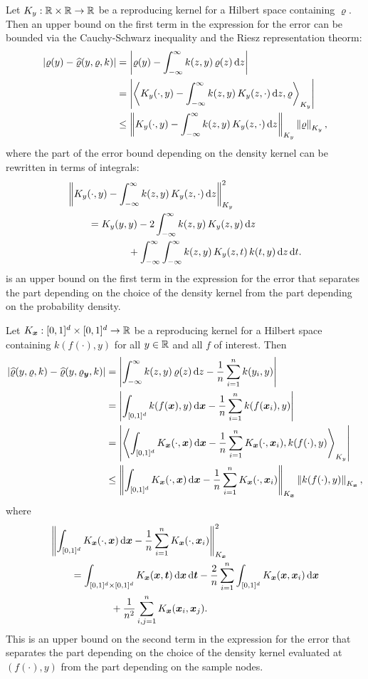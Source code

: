 \documentclass[letterpaper]{amsart}
\newcommand{\hvarrho}{\widehat{\varrho}}
\newcommand{\KY}{K_y}
\newcommand{\KX}{K_{\vx}}
\begin{document}
Let $\KY:\reals \times \reals \to \reals$ be a reproducing kernel for a Hilbert space containing $\varrho$.  Then an upper bound on the first term in the expression for the error can be bounded via the Cauchy-Schwarz inequality and the Riesz representation theorm:
\begin{align}
\label{eq:firstbd}
\abs{\varrho(y) - \hvarrho(y,\varrho,k)}
& = \abs{\varrho(y) - \int_{-\infty}^{\infty} k(z,y) \, \varrho(z) \, \dif z} \\
\nonumber
& = \abs{\ip[\KY]{\KY(\cdot,y) - \int_{-\infty}^{\infty} k(z,y) \, \KY(z,\cdot) \,  \dif z}{\varrho} } \\
\nonumber
& \le  \norm[\KY]{\KY(\cdot,y) - \int_{-\infty}^{\infty} k(z,y) \, \KY(z,\cdot) \, \dif z} \norm[\KY]{\varrho},
\end{align}
where the part of the error bound depending on the density kernel can be rewritten in terms of integrals:
\begin{align}
\label{eq:kquality}
\MoveEqLeft{\norm[\KY]{\KY(\cdot,y) - \int_{-\infty}^{\infty} k(z,y) \, \KY(z,\cdot) \, \dif z}^2} \\ \nonumber
&=  \KY(y,y) - 2 \int_{-\infty}^{\infty} k(z,y) \, \KY(z,y) \, \dif z \\ \nonumber
& \qquad \qquad + \int_{-\infty}^{\infty} \int_{-\infty}^{\infty}  k(z,y) \, \KY(z,t) \, k(t,y)\, \dif z \, \dif t.
\end{align}
 is an upper bound on the first term in the expression for the error that separates the part depending on the choice of the density kernel from the part depending on the probability density.

Let $\KX: [0,1]^d \times [0,1]^d\to \reals$ be a reproducing kernel for a Hilbert space containing $k(f(\cdot),y)$ for all $y \in \mathbb{R}$ and all $f$ of interest. Then
\begin{align*}
\abs{\hvarrho(y,\varrho,k) - \hvarrho(y,\varrho_{\vy},k)}
& = \abs{\int_{-\infty}^{\infty} k(z,y) \, \varrho(z) \, \dif z -
\frac 1n \sum_{i=1}^n k(y_i,y)} \\
& = \abs{\int_{[0,1]^d} k(f(\vx),y) \, \dif \vx -
\frac 1n \sum_{i=1}^n k(f(\vx_i),y)} \\
& = \abs{\ip[\KY]{\int_{[0,1]^d} \KX(\cdot,\vx) \, \dif \vx -
\frac 1n \sum_{i=1}^n \KX(\cdot,\vx_i)}{k(f(\cdot),y) }} \\
& \le  \norm[\KX]{\int_{[0,1]^d} \KX(\cdot,\vx) \, \dif \vx -
\frac 1n \sum_{i=1}^n \KX(\cdot,\vx_i)} \norm[\KX]{k(f(\cdot),y) } ,
\end{align*}
where
\begin{align*}
\MoveEqLeft{\norm[\KX]{\int_{[0,1]^d} \KX(\cdot,\vx) \, \dif \vx -
\frac 1n \sum_{i=1}^n \KX(\cdot,\vx_i)}^2} \\
&=  \int_{[0,1]^d \times [0,1]^d} \KX(\vx,\vt) \, \dif \vx \, \dif \vt -
\frac 2n \sum_{i=1}^n \int_{[0,1]^d} \KX(\vx,\vx_i) \, \dif \vx \\
& \qquad \qquad + \frac 1{n^2} \sum_{i,j=1}^n  \KX(\vx_i,\vx_j) .
\end{align*}
This is an upper bound on the second term in the expression for the error that separates the part depending on the choice of the density kernel evaluated at $(f(\cdot),y)$ from the part depending on the sample nodes.
\end{document}
